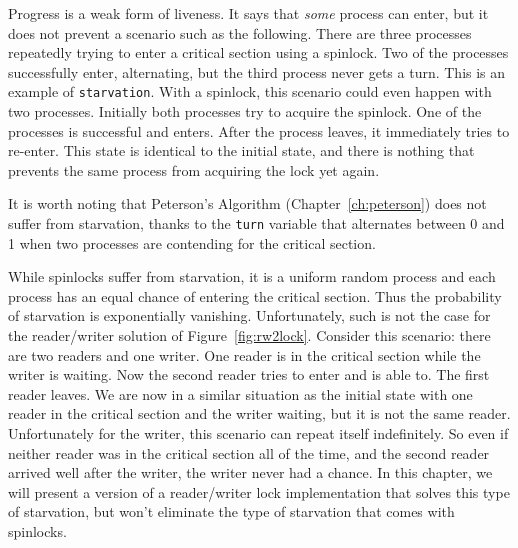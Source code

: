 \documentclass{report}
\begin{document}
Progress is a weak form of liveness.  It says that \emph{some}
process can enter, but it does not prevent a scenario such as
the following.  There are three processes repeatedly trying to
enter a critical section using a spinlock.  Two of
the processes successfully enter, alternating, but the third
process never gets a turn.  This is an example of
\texttt{starvation}.  With a spinlock, this scenario could
even happen with two processes.  Initially both processes
try to acquire the spinlock.  One of the processes is
successful and enters.  After the process leaves, it immediately
tries to re-enter.  This state is identical to the initial
state, and there is nothing that prevents the same process
from acquiring the lock yet again.

It is worth noting that Peterson's Algorithm (Chapter~\ref{ch:peterson})
does not suffer from starvation, thanks to the \texttt{turn} variable
that alternates between 0 and 1 when two processes are contending for
the critical section.

While spinlocks suffer from starvation, it is a uniform random
process and each process has an equal chance of entering the critical
section.  Thus the probability of starvation is exponentially vanishing.
Unfortunately, such is not the case for the
reader/writer solution of Figure~\ref{fig:rw2lock}.
Consider this scenario: there are two readers and one writer.  One reader
is in the critical section while the writer is waiting.  Now the
second reader tries to enter and is able to.  The first reader leaves.
We are now in a similar situation as the initial state with one reader
in the critical section and the writer waiting, but it is not the same
reader.  Unfortunately for the writer, this scenario can repeat itself
indefinitely.  So even if neither reader was in the critical section
all of the time, and the second reader arrived well after the writer,
the writer never had a chance.
In this chapter, we will present a version of a reader/writer lock
implementation that solves this type of starvation, but won't eliminate
the type of starvation that comes with spinlocks.
\end{document}
